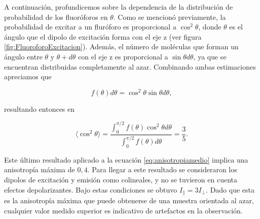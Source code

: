 
A continuación, profundicemos sobre la dependencia de la distribución de probabilidad de los fluoróforos en $\theta$. Como se mencionó previamente, la probabilidad de excitar a un fluróforo es proporcional a $\cos^{2} \theta$, donde $\theta$ es el ángulo que el dipolo de excitación forma con el eje z (ver figura \ref{fig:FluoroforoExcitacion}). Además, el número de moléculas que forman un ángulo entre $\theta$ y $\theta + d\theta$ con el eje z es proporcional a $\sin{\theta} d\theta$, ya que se encuentran distribuidas completamente al azar. Combinando ambas estimaciones apreciamos que

\begin{equation}
    f(\theta) d\theta = \cos^{2} \theta \sin{ \theta} d\theta,
\end{equation}

\noindent resultando entonces en

\begin{equation}
    \langle \cos^{2} \theta \rangle = \frac{ \int_0^{\pi/2} f(\theta) \cos^{2} \theta d\theta} {\int_0^{\pi/2} f(\theta) d\theta} = \frac{3}{5}.
\end{equation}

\noindent Este último resultado aplicado a la ecuación \ref{eq:anisotropiamedio} implica una anisotropía máxima de $0,4$. Para llegar a este resultado se consideraron los dipolos de excitación y emisión como colineales, y no se tuvieron en cuenta efectos depolarizantes. Bajo estas condiciones se obtuvo $I_{\parallel} = 3 I_{\perp}$. Dado que esta es la anisotropía máxima que puede obtenerse de una muestra orientada al azar, cualquier valor medido superior es indicativo de artefactos en la observación\cite{Tramier2008}.

